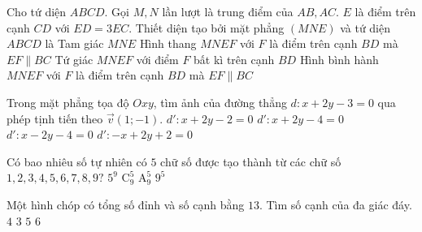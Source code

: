 \begin{ex}%
Cho tứ diện $ABCD$. Gọi $M,N$ lần lượt là trung điểm của $AB,AC$. $E$ là điểm trên cạnh $CD$ với $ED=3EC$. Thiết diện tạo bởi mặt phẳng $(MNE)$ và tứ diện $ABCD$ là 
\choice
{Tam giác $MNE$}
{\True Hình thang $MNEF$ với $F$ là điểm trên cạnh $BD$ mà $EF \parallel BC$}
{Tứ giác $MNEF$ với điểm $F$ bất kì trên cạnh $BD$}
{Hình bình hành $MNEF$ với $F$ là điểm trên cạnh $BD$ mà $EF \parallel BC$}
\end{ex}

\begin{ex}%
Trong mặt phẳng tọa độ $Oxy$, tìm ảnh của đường thẳng $d:x+2y-3=0$ qua phép tịnh tiến theo $\vec{v}(1;-1)$.
\choice
{\True $d' :x+2y-2=0$}
{$d' :x+2y-4=0$}
{$d' :x-2y-4=0$}
{$d' :-x+2y+2=0$}
\end{ex}

\begin{ex}%
Có bao nhiêu số tự nhiên có $5$ chữ số được tạo thành từ các chữ số $1,2,3,4,5,6,7,8,9?$
\choice
{$5^9$}
{$\mathrm{C_9^5}$}
{$\mathrm{A_9^5}$}
{\True $9^5$}
\end{ex}

\begin{ex}%
Một hình chóp có tổng số đỉnh và số cạnh bằng $13$. Tìm số cạnh của đa giác đáy.
\choice
{$4$}
{$3$}
{$5$}
{\True $6$}
\end{ex}

